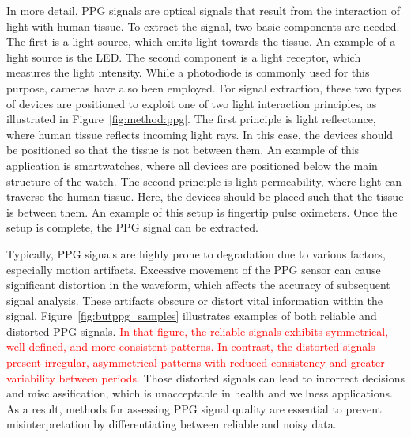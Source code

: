In more detail, \gls{PPG} signals are optical signals that result from the interaction of light with human tissue. To extract the signal, two basic components are needed. The first is a light source, which emits light towards the tissue. An example of a light source is the \gls{LED}. The second component is a light receptor, which measures the light intensity. While a photodiode is commonly used for this purpose, cameras have also been employed. For signal extraction, these two types of devices are positioned to exploit one of two light interaction principles, as illustrated in Figure~\ref{fig:method:ppg}. The first principle is light reflectance, where human tissue reflects incoming light rays. In this case, the devices should be positioned so that the tissue is not between them. An example of this application is smartwatches, where all devices are positioned below the main structure of the watch. The second principle is light permeability, where light can traverse the human tissue. Here, the devices should be placed such that the tissue is between them. An example of this setup is fingertip pulse oximeters. Once the setup is complete, the \gls{PPG} signal can be extracted. 



Typically, \gls{PPG} signals are highly prone to degradation due to various factors, especially motion artifacts. Excessive movement of the \gls{PPG} sensor can cause significant distortion in the waveform, which affects the accuracy of subsequent signal analysis. These artifacts obscure or distort vital information within the signal. Figure~\ref{fig:butppg_samples} illustrates examples of both reliable and distorted \gls{PPG} signals. \textcolor{red}{In that figure, the reliable signals exhibits symmetrical, well-defined, and more consistent patterns. In contrast, the distorted signals present irregular, asymmetrical patterns with reduced consistency and greater variability between periods.} Those distorted signals can lead to incorrect decisions and misclassification, which is unacceptable in health and wellness applications. As a result, methods for assessing \gls{PPG} signal quality are essential to prevent misinterpretation by differentiating between reliable and noisy data.

